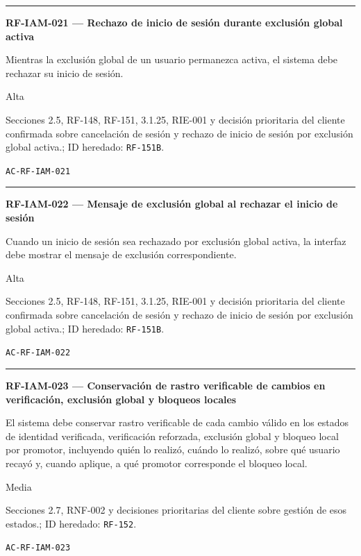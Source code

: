 \documentclass[10pt,letterpaper]{article}
\begin{document}
\vspace{0.25em}\hrule\vspace{0.65em}
\noindent\textbf{RF-IAM-021 --- Rechazo de inicio de sesión durante exclusión global activa}\par
\begin{description}[style=nextline,leftmargin=3.15cm,labelwidth=2.8cm,font=\normalfont\bfseries]
\item[Obligación] Mientras la exclusión global de un usuario permanezca activa, el sistema debe rechazar su inicio de sesión.
\item[Prioridad] Alta
\item[Procedencia] Secciones 2.5, RF-148, RF-151, 3.1.25, RIE-001 y decisión prioritaria del cliente confirmada sobre cancelación de sesión y rechazo de inicio de sesión por exclusión global activa.; ID heredado: \texttt{RF-151B}.
\item[Verificación] \texttt{AC-RF-IAM-021}
\end{description}
\vspace{0.25em}\hrule\vspace{0.65em}
\noindent\textbf{RF-IAM-022 --- Mensaje de exclusión global al rechazar el inicio de sesión}\par
\begin{description}[style=nextline,leftmargin=3.15cm,labelwidth=2.8cm,font=\normalfont\bfseries]
\item[Obligación] Cuando un inicio de sesión sea rechazado por exclusión global activa, la interfaz debe mostrar el mensaje de exclusión correspondiente.
\item[Prioridad] Alta
\item[Procedencia] Secciones 2.5, RF-148, RF-151, 3.1.25, RIE-001 y decisión prioritaria del cliente confirmada sobre cancelación de sesión y rechazo de inicio de sesión por exclusión global activa.; ID heredado: \texttt{RF-151B}.
\item[Verificación] \texttt{AC-RF-IAM-022}
\end{description}
\vspace{0.25em}\hrule\vspace{0.65em}
\noindent\textbf{RF-IAM-023 --- Conservación de rastro verificable de cambios en verificación, exclusión global y bloqueos locales}\par
\begin{description}[style=nextline,leftmargin=3.15cm,labelwidth=2.8cm,font=\normalfont\bfseries]
\item[Obligación] El sistema debe conservar rastro verificable de cada cambio válido en los estados de identidad verificada, verificación reforzada, exclusión global y bloqueo local por promotor, incluyendo quién lo realizó, cuándo lo realizó, sobre qué usuario recayó y, cuando aplique, a qué promotor corresponde el bloqueo local.
\item[Prioridad] Media
\item[Procedencia] Secciones 2.7, RNF-002 y decisiones prioritarias del cliente sobre gestión de esos estados.; ID heredado: \texttt{RF-152}.
\item[Verificación] \texttt{AC-RF-IAM-023}
\end{description}
\end{document}
